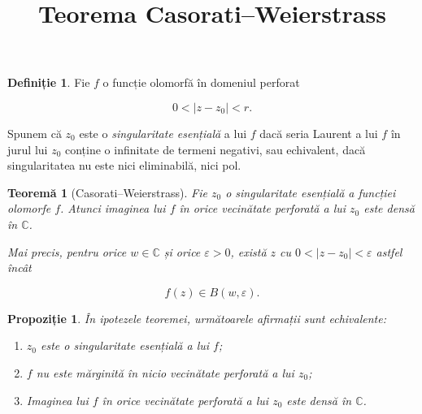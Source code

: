 \documentclass[12pt]{article}
\title{Teorema Casorati--Weierstrass}
\author{}
\date{}
\theoremstyle{definition}
\newtheorem{definition}{Definiție}
\theoremstyle{plain}
\newtheorem{theorem}{Teoremă}
\newtheorem{proposition}{Propoziție}
\begin{document}
\maketitle

\begin{definition}
Fie $f$ o funcție olomorfă în domeniul perforat


\[
0 < |z - z_0| < r.
\]


Spunem că $z_0$ este o \emph{singularitate esențială} a lui $f$ dacă seria Laurent a lui $f$ în jurul lui $z_0$ conține o infinitate de termeni negativi, sau echivalent, dacă singularitatea nu este nici eliminabilă, nici pol.
\end{definition}

\begin{theorem}[Casorati--Weierstrass]
Fie $z_0$ o singularitate esențială a funcției olomorfe $f$. Atunci imaginea lui $f$ în orice vecinătate perforată a lui $z_0$ este densă în $\mathbb{C}$.

Mai precis, pentru orice $w \in \mathbb{C}$ și orice $\varepsilon > 0$, există $z$ cu $0 < |z - z_0| < \varepsilon$ astfel încât


\[
f(z) \in B(w, \varepsilon).
\]


\end{theorem}

\begin{proposition}
În ipotezele teoremei, următoarele afirmații sunt echivalente:
\begin{enumerate}
    \item[(i)] $z_0$ este o singularitate esențială a lui $f$;
    \item[(ii)] $f$ nu este mărginită în nicio vecinătate perforată a lui $z_0$;
    \item[(iii)] Imaginea lui $f$ în orice vecinătate perforată a lui $z_0$ este densă în $\mathbb{C}$.
\end{enumerate}
\end{proposition}
\end{document}
